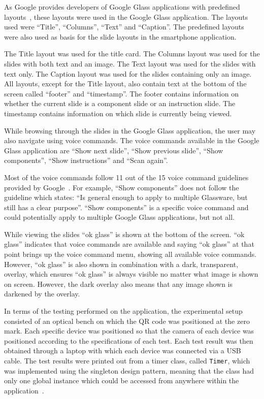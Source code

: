 As Google provides developers of Google Glass applications with predefined layouts~\cite{cardLayout}, these layouts were used in the Google Glass application. The layouts used were ``Title'', ``Columns'', ``Text'' and ``Caption''. The predefined layouts were also used as basis for the slide layouts in the smartphone application.

The Title layout was used for the title card. The Columns layout was used for the slides with both text and an image. The Text layout was used for the slides with text only. The Caption layout was used for the slides containing only an image. All layouts, except for the Title layout, also contain text at the bottom of the screen called ``footer'' and ``timestamp''. The footer contains information on whether the current slide is a component slide or an instruction slide. The timestamp contains information on which slide is currently being viewed.

While browsing through the slides in the Google Glass application, the user may also navigate using voice commands. The voice commands available in the Google Glass application are ``Show next slide'', ``Show previous slide'', ``Show components'', ``Show instructions'' and ``Scan again''.

Most of the voice commands follow 11 out of the 15 voice command guidelines provided by Google~\cite{glassVoiceChecklist}. For example, ``Show components'' does not follow the guideline which states: ``Is general enough to apply to multiple Glassware, but still has a clear purpose''. ``Show components'' is a specific voice command and could potentially apply to multiple Google Glass applications, but not all.

While viewing the slides ``ok glass'' is shown at the bottom of the screen. ``ok glass'' indicates that voice commands are available and saying ``ok glass'' at that point brings up the voice command menu, showing all available voice commands. However, ``ok glass'' is also shown in combination with a dark, transparent, overlay, which ensures ``ok glass'' is always visible no matter what image is shown on screen. However, the dark overlay also means that any image shown is darkened by the overlay.

In terms of the testing performed on the application, the experimental setup consisted of an optical bench on which the QR code was positioned at the zero mark. Each specific device was positioned so that the camera of each device was positioned according to the specifications of each test. Each test result was then obtained through a laptop with which each device was connected via a USB cable. The test results were printed out from a timer class, called \texttt{Timer}, which was implemented using the singleton design pattern, meaning that the class had only one global instance which could be accessed from anywhere within the application~\cite{singleton}.

